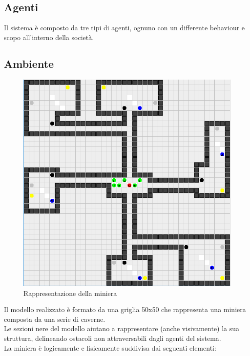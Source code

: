 \documentclass{llncs}
\begin{document}
\subsection{Agenti}
Il sistema è composto da tre tipi di agenti, ognuno con un differente behaviour e scopo all'interno della società.
\newpage
\subsection{Ambiente}
\begin{figure}[htbp]
  \centering
   \includegraphics[scale = 0.55]{img/miniera.png}
  \caption{Rappresentazione della miniera}
\end{figure}
Il modello realizzato è formato da una griglia 50x50 che rappresenta una miniera composta da una serie di caverne.\\
Le sezioni nere del modello aiutano a rappresentare (anche visivamente) la sua struttura, delineando ostacoli non attraversabili dagli agenti del sistema.\\
La miniera è logicamente e fisicamente suddivisa dai seguenti elementi:
\end{document}
